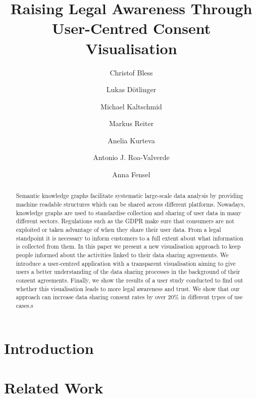 \documentclass{llncs}
\title{Raising Legal Awareness Through User-Centred Consent Visualisation}
\author{Christof Bless \and Lukas Dötlinger \and Michael Kaltschmid \and Markus Reiter \and Anelia Kurteva \and Antonio J. Roa-Valverde \and Anna Fensel }
\institute{Institute of Computer Science, University of Innsbruck}
\begin{document}
\maketitle

\begin{abstract}
  Semantic knowledge graphs facilitate systematic large-scale data analysis by providing machine readable structures which can be shared across different platforms.
  Nowadays, knowledge graphs are used to standardise collection and sharing of user data in many different sectors. 
  Regulations such as the GDPR make sure that consumers
  are not exploited or taken advantage of when they share their user data.
  From a legal standpoint it is
  necessary to inform customers to a full extent about what information is
  collected from them. In this paper we present a new visualisation approach
  to keep people informed about the activities linked to their data sharing
  agreements. We introduce a user-centred application with a transparent
  visualisation aiming to give users a better understanding of the data sharing
  processes in the background of their consent agreements. Finally, we show
  the results of a user study conducted to find out whether this
  visualisation leads to more legal awareness and trust.
  We show that our approach can increase data sharing consent rates by over 20\% in different types of use cases.s
\end{abstract}


\section{Introduction}
\label{sec:introduction}


\section{Related Work}
\label{sec:related_work}

\end{document}
